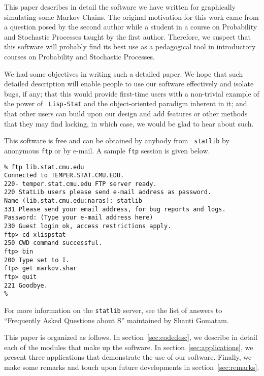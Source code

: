 This paper describes in detail the software we have written for
graphically simulating some Markov Chains.  The original motivation
for this work came from a question posed by the second author while a
student in a course on Probability and Stochastic Processes taught by
the first author.  Therefore, we suspect that this software will
probably find its best use as a pedagogical tool in introductory
courses on Probability and Stochastic Processes. 

We had some objectives in writing such a detailed paper.  We
hope that such detailed description will enable people to use our
software effectively and isolate bugs, if any; that this would provide
first-time users with a non-trivial example of the power of {\tt
  Lisp-Stat}\cite{luke} and the object-oriented paradigm inherent in
it; and that 
other users can build upon our design and add features or other
methods that they may find lacking, in which case, we would be glad to
hear about such.

This software is free and can be obtained by anybody from {\tt
  statlib} by anonymous {\tt ftp} or by e-mail. A sample {\tt ftp}
session is given below.
\begin{verbatim}
% ftp lib.stat.cmu.edu
Connected to TEMPER.STAT.CMU.EDU.
220- temper.stat.cmu.edu FTP server ready.
220 StatLib users please send e-mail address as password.
Name (lib.stat.cmu.edu:naras): statlib
331 Please send your email address, for bug reports and logs.
Password: (Type your e-mail address here)
230 Guest login ok, access restrictions apply.
ftp> cd xlispstat
250 CWD command successful.
ftp> bin
200 Type set to I.
ftp> get markov.shar
ftp> quit
221 Goodbye.
%
\end{verbatim}

For more information on the {\tt statlib} server, see the list of
answers to ``Frequently Asked Questions about S'' maintained by Shanti
Gomatam\cite{shanti}. 

This paper is organized as follows.  In section~\ref{sec:codedesc}, we
describe in detail each of the modules that make up the software. In
section~\ref{sec:applications}, we present three applications that
demonstrate the use of our software. Finally, we make some remarks and
touch upon future developments in section~\ref{sec:remarks}.













